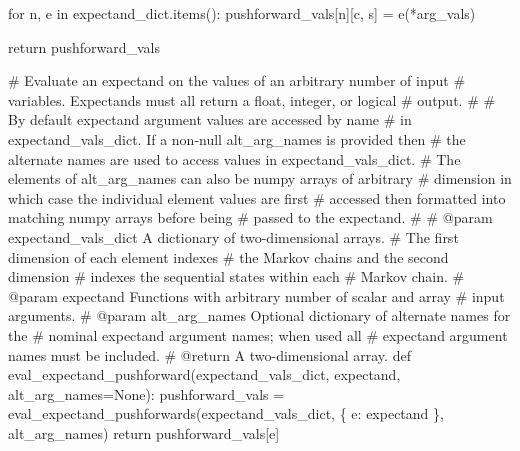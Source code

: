 \documentclass[
  letterpaper,
  DIV=11,
  numbers=noendperiod]{scrartcl}
\newenvironment{Shaded}{\begin{snugshade}}{\end{snugshade}}
\newcommand{\CommentTok}[1]{\textcolor[rgb]{0.37,0.37,0.37}{#1}}
\newcommand{\ControlFlowTok}[1]{\textcolor[rgb]{0.00,0.23,0.31}{#1}}
\newcommand{\KeywordTok}[1]{\textcolor[rgb]{0.00,0.23,0.31}{#1}}
\newcommand{\NormalTok}[1]{\textcolor[rgb]{0.00,0.23,0.31}{#1}}
\newcommand{\OperatorTok}[1]{\textcolor[rgb]{0.37,0.37,0.37}{#1}}
\newcommand{\StringTok}[1]{\textcolor[rgb]{0.13,0.47,0.30}{#1}}
\newcommand{\VariableTok}[1]{\textcolor[rgb]{0.07,0.07,0.07}{#1}}
\begin{document}
\begin{Shaded}
\begin{Highlighting}[]
      \ControlFlowTok{for}\NormalTok{ n, e }\KeywordTok{in}\NormalTok{ expectand\_dict.items():}
\NormalTok{        pushforward\_vals[n][c, s] }\OperatorTok{=}\NormalTok{ e(}\OperatorTok{*}\NormalTok{arg\_vals)}

  \ControlFlowTok{return}\NormalTok{ pushforward\_vals}
\end{Highlighting}
\end{Shaded}

\begin{Shaded}
\begin{Highlighting}[]
\CommentTok{\# Evaluate an expectand on the values of an arbitrary number of input}
\CommentTok{\# variables.  Expectands must all return a float, integer, or logical}
\CommentTok{\# output.}
\CommentTok{\#}
\CommentTok{\# By default expectand argument values are accessed by name}
\CommentTok{\# in expectand\_vals\_dict.  If a non{-}null alt\_arg\_names is provided then}
\CommentTok{\# the alternate names are used to access values in expectand\_vals\_dict.}
\CommentTok{\# The elements of alt\_arg\_names can also be numpy arrays of arbitrary}
\CommentTok{\# dimension in which case the individual element values are first}
\CommentTok{\# accessed then formatted into matching numpy arrays before being}
\CommentTok{\# passed to the expectand.}
\CommentTok{\#}
\CommentTok{\# @param expectand\_vals\_dict A dictionary of two{-}dimensional arrays.}
\CommentTok{\#                            The first dimension of each element indexes}
\CommentTok{\#                            the Markov chains and the second dimension}
\CommentTok{\#                            indexes the sequential states within each}
\CommentTok{\#                            Markov chain.}
\CommentTok{\# @param expectand Functions with arbitrary number of scalar and array}
\CommentTok{\#                  input arguments.}
\CommentTok{\# @param alt\_arg\_names Optional dictionary of alternate names for the}
\CommentTok{\#                      nominal expectand argument names; when used all}
\CommentTok{\#                      expectand argument names must be included.}
\CommentTok{\# @return A two{-}dimensional array.}
\KeywordTok{def}\NormalTok{ eval\_expectand\_pushforward(expectand\_vals\_dict,}
\NormalTok{                               expectand,}
\NormalTok{                               alt\_arg\_names}\OperatorTok{=}\VariableTok{None}\NormalTok{):}
\NormalTok{  pushforward\_vals }\OperatorTok{=}\NormalTok{ eval\_expectand\_pushforwards(expectand\_vals\_dict,}
\NormalTok{                                                 \{ }\StringTok{\textquotesingle{}e\textquotesingle{}}\NormalTok{: expectand \},}
\NormalTok{                                                 alt\_arg\_names)}
  \ControlFlowTok{return}\NormalTok{ pushforward\_vals[}\StringTok{\textquotesingle{}e\textquotesingle{}}\NormalTok{]}
\end{Highlighting}
\end{Shaded}
\end{document}

